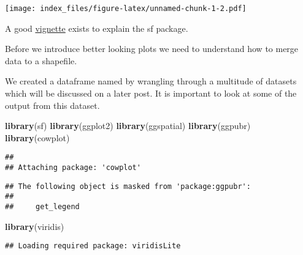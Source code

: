 \documentclass[
]{article}
\newenvironment{Shaded}{\begin{snugshade}}{\end{snugshade}}
\newcommand{\CommentTok}[1]{\textcolor[rgb]{0.56,0.35,0.01}{\textit{#1}}}
\newcommand{\FunctionTok}[1]{\textcolor[rgb]{0.13,0.29,0.53}{\textbf{#1}}}
\newcommand{\NormalTok}[1]{#1}
\begin{document}
\texttt{[image: index\_files/figure-latex/unnamed-chunk-1-2.pdf]}

\begin{Shaded}
\end{Shaded}

A good \href{https://r-spatial.github.io/sf/articles/}{vignette} exists
to explain the sf package.

Before we introduce better looking plots we need to understand how to
merge data to a shapefile.

We created a dataframe named  by wrangling through a
multitude of datasets which will be discussed on a later post. It is
important to look at some of the output from this dataset.

\begin{Shaded}
\begin{Highlighting}[]
\FunctionTok{library}\NormalTok{(sf)}
\FunctionTok{library}\NormalTok{(ggplot2)}
\FunctionTok{library}\NormalTok{(ggspatial)}
\FunctionTok{library}\NormalTok{(ggpubr)}
\FunctionTok{library}\NormalTok{(cowplot)}
\end{Highlighting}
\end{Shaded}

\begin{verbatim}
## 
## Attaching package: 'cowplot'
\end{verbatim}

\begin{verbatim}
## The following object is masked from 'package:ggpubr':
## 
##     get_legend
\end{verbatim}

\begin{Shaded}
\begin{Highlighting}[]
\FunctionTok{library}\NormalTok{(viridis)}
\end{Highlighting}
\end{Shaded}

\begin{verbatim}
## Loading required package: viridisLite
\end{verbatim}
\end{document}
